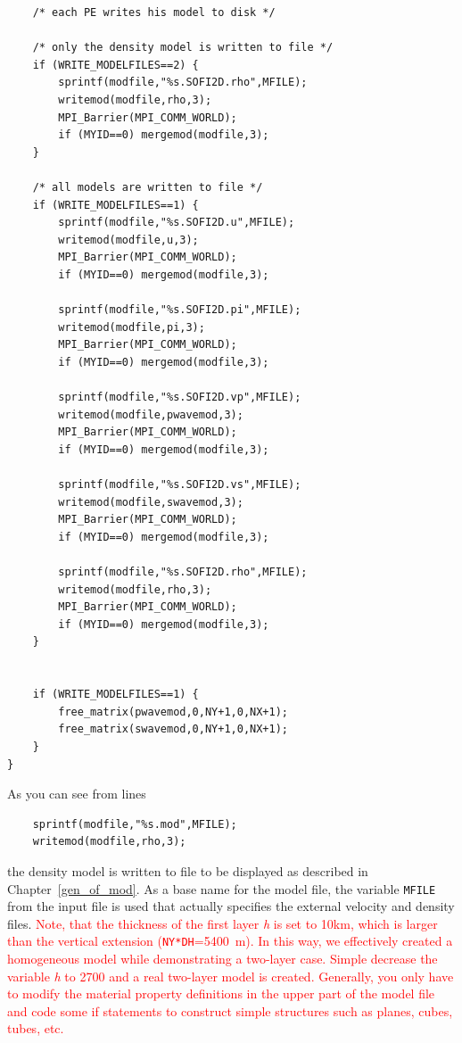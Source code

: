\begin{verbatim}
	/* each PE writes his model to disk */

	/* only the density model is written to file */
	if (WRITE_MODELFILES==2) {
		sprintf(modfile,"%s.SOFI2D.rho",MFILE);
		writemod(modfile,rho,3);
		MPI_Barrier(MPI_COMM_WORLD);
		if (MYID==0) mergemod(modfile,3);
	}

	/* all models are written to file */
	if (WRITE_MODELFILES==1) {
		sprintf(modfile,"%s.SOFI2D.u",MFILE);
		writemod(modfile,u,3);
		MPI_Barrier(MPI_COMM_WORLD);
		if (MYID==0) mergemod(modfile,3);

		sprintf(modfile,"%s.SOFI2D.pi",MFILE);
		writemod(modfile,pi,3);
		MPI_Barrier(MPI_COMM_WORLD);
		if (MYID==0) mergemod(modfile,3);

		sprintf(modfile,"%s.SOFI2D.vp",MFILE);
		writemod(modfile,pwavemod,3);
		MPI_Barrier(MPI_COMM_WORLD);
		if (MYID==0) mergemod(modfile,3);

		sprintf(modfile,"%s.SOFI2D.vs",MFILE);
		writemod(modfile,swavemod,3);
		MPI_Barrier(MPI_COMM_WORLD);
		if (MYID==0) mergemod(modfile,3);

		sprintf(modfile,"%s.SOFI2D.rho",MFILE);
		writemod(modfile,rho,3);
		MPI_Barrier(MPI_COMM_WORLD);
		if (MYID==0) mergemod(modfile,3);
	}


	if (WRITE_MODELFILES==1) {
		free_matrix(pwavemod,0,NY+1,0,NX+1);
		free_matrix(swavemod,0,NY+1,0,NX+1);
	}
}
\end{verbatim}

As you can see from lines
\begin{verbatim}
	sprintf(modfile,"%s.mod",MFILE);
	writemod(modfile,rho,3);
\end{verbatim}
the density model is written to file to be displayed as described in Chapter~\ref{gen_of_mod}. As a base name for the model file, the variable \texttt{MFILE} from the input file is used that actually specifies the external velocity and density files. \textcolor{red}{Note, that the thickness of the first layer \textit{h} is set to \si{10}{km}, which is larger than the vertical extension (\texttt{NY*DH}=\SI{5400}{m}). In this way, we effectively created a homogeneous model while demonstrating a two-layer case. Simple decrease the variable \textit{h} to \SI{2700}{} and a real two-layer model is created. Generally, you only have to modify the material property definitions in the upper part of the model file and code some if statements to construct simple structures such as planes, cubes, tubes, etc.}

